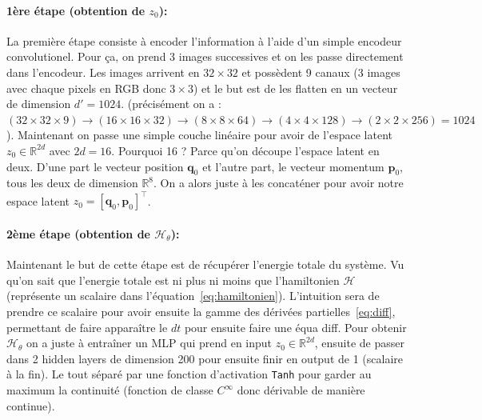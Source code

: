 \documentclass[11pt]{article}
\begin{document}
\paragraph{1ère étape (obtention de $z_0$):}
La première étape consiste à encoder l'information à l'aide d'un simple encodeur convolutionel. Pour ça, on prend 3 images successives et on les passe directement dans l'encodeur. Les images arrivent en $32 \times 32$ et possèdent 9 canaux (3 images avec chaque pixels en RGB donc $3 \times 3$) et le but est de les flatten en un vecteur de dimension $d' = 1024$. (précisément on a : $(32 \times 32 \times 9) \rightarrow (16 \times 16 \times 32) \rightarrow (8 \times 8 \times 64) \rightarrow (4 \times 4 \times 128) \rightarrow (2 \times 2 \times 256) = 1024$). Maintenant on passe une simple couche linéaire pour avoir de l'espace latent $z_0 \in \mathbb{R}^{2d}$ avec $2d = 16$. Pourquoi 16 ? Parce qu'on découpe l'espace latent en deux. D'une part le vecteur position $\mathbf{q}_0$ et l'autre part, le vecteur momentum $\mathbf{p}_0$, tous les deux de dimension $\mathbb{R}^8$. On a alors juste à les concaténer pour avoir notre espace latent $z_0 = [\mathbf{q}_0,\mathbf{p}_0]^{\top}$.

\paragraph{2ème étape (obtention de $\mathcal{H}_{\theta}$):}
Maintenant le but de cette étape est de récupérer l'energie totale du système. Vu qu'on sait que l'energie totale est ni plus ni moins que l'hamiltonien $\mathcal{H}$ (représente un scalaire dans l'équation~\ref{eq:hamiltonien}). L'intuition sera de prendre ce scalaire pour avoir ensuite la gamme des dérivées partielles~\ref{eq:diff}, permettant de faire apparaître le $dt$ pour ensuite faire une équa diff. Pour obtenir $\mathcal{H}_{\theta}$ on a juste à entraîner un MLP qui prend en input  $z_0 \in \mathbb{R}^{2d}$, ensuite de passer dans 2 hidden layers de dimension 200 pour ensuite finir en output de 1 (scalaire à la fin). Le tout séparé par une fonction d'activation \texttt{Tanh} pour garder au maximum la continuité (fonction de classe $C^{\infty}$ donc dérivable de manière continue).
\end{document}
